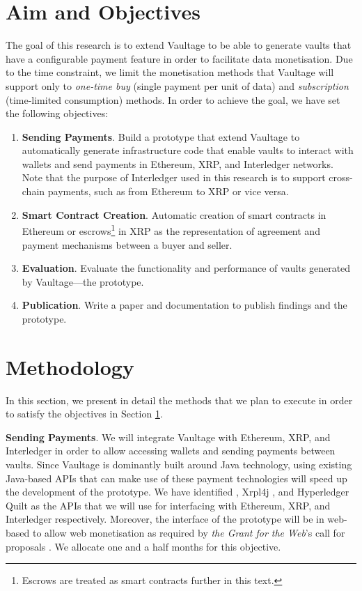 \documentclass[]{article}
\begin{document}
\section{Aim and Objectives}
\label{sec:aim_and_objectives}
The goal of this research is to extend Vaultage to be able to generate vaults that have a configurable payment feature in order to facilitate data monetisation. Due to the time constraint, we limit the monetisation methods that Vaultage will support only to \emph{one-time buy} (single payment per unit of data) and \emph{subscription} (time-limited consumption) methods. In order to achieve the goal, we have set the following objectives:
\begin{enumerate}
\item \textbf{Sending Payments}. Build a prototype that extend Vaultage to automatically generate infrastructure code that enable vaults to interact with wallets and send payments in Ethereum, XRP, and Interledger networks. Note that the purpose of Interledger used in this research is to support cross-chain payments, such as from Ethereum to XRP or vice versa.
\item \textbf{Smart Contract Creation}. Automatic creation of smart contracts in Ethereum or escrows\footnote{Escrows are treated as smart contracts further in this text.} \cite{xrpl-escrow} in XRP as the representation of agreement and payment mechanisms between a buyer and seller. 
\item \textbf{Evaluation}. Evaluate the functionality and performance of vaults generated by Vaultage---the prototype. 
\item \textbf{Publication}. Write a paper and documentation to publish findings and the prototype.
\end{enumerate}  

\section{Methodology}
\label{Methodology}
In this section, we present in detail the methods that we plan to execute in order to satisfy the objectives in Section \ref{sec:aim_and_objectives}. 

\textbf{Sending Payments}. We will integrate Vaultage with Ethereum, XRP, and Interledger in order to allow accessing wallets and sending payments between vaults. Since Vaultage is dominantly built around Java technology, using existing Java-based APIs that can make use of these payment technologies will speed up the development of the prototype. We have identified \cite{web3j}, Xrpl4j \cite{xrpl4j}, and Hyperledger Quilt \cite{quilt} as the APIs that we will use for interfacing with Ethereum, XRP, and Interledger respectively. Moreover, the interface of the prototype will be in web-based to allow web monetisation as required by \emph{the Grant for the Web}'s call for proposals \cite{grant-for-the-web}. We allocate one and a half months for this objective. 
\end{document}
